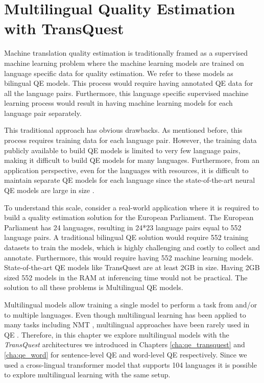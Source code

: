 \newcommand\figlength{6cm}

\chapter{\label{cha:qe_multilingual}Multilingual Quality Estimation with TransQuest}

Machine translation quality estimation is traditionally framed as a supervised machine learning problem \autocite{kepler-etal-2019-openkiwi,lee-2020-two} where the machine learning models are trained on language specific data for quality estimation. We refer to these models as bilingual QE models. This process would require having annotated QE data for all the language pairs. Furthermore, this language specific supervised machine learning process would result in having machine learning models for each language pair separately. 

This traditional approach has obvious drawbacks. As mentioned before, this process requires training data for each language pair. However, the training data publicly available to build QE models is limited to very few language pairs, making it difficult to build QE models for many languages. Furthermore, from an application perspective, even for the languages with resources, it is difficult to maintain separate QE models for each language since the state-of-the-art neural QE models are large in size \autocite{ranasinghe-etal-2020-transquest}. 

To understand this scale, consider a real-world application where it is required to build a quality estimation solution for the European Parliament. The European Parliament has 24 languages, resulting in 24*23 language pairs equal to 552 language pairs. A traditional bilingual QE solution would require 552 training datasets to train the models, which is highly challenging and costly to collect and annotate. Furthermore, this would require having 552 machine learning models. State-of-the-art QE models like TransQuest are at least 2GB in size. Having 2GB sized 552 models in the RAM at inferencing time would not be practical. The solution to all these problems is Multilingual QE models. 

Multilingual models allow training a single model to perform a task from and/or to multiple languages. Even though multilingual learning has been applied to many tasks \autocite{ranasinghe-zampieri-2020-multilingual,ranasinghe-zampieri-2021-mudes} including NMT \autocite{nguyen-chiang-2017-transfer, aharoni-etal-2019-massively}, multilingual approaches have been rarely used in QE \autocite{sun-etal-2020-exploratory}. Therefore, in this chapter we explore multilingual models with the \textit{TransQuest} architectures we introduced in Chapters \ref{cha:qe_transquest} and \ref{cha:qe_word} for sentence-level QE and word-level QE respectively. Since we used a cross-lingual transformer model that supports 104 languages \autocite{conneau-etal-2020-unsupervised} it is possible to explore multilingual learning with the same setup.


